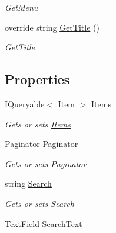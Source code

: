 \begin{DoxyCompactItemize}
\begin{DoxyCompactList}\small\item\em Get\+Menu \end{DoxyCompactList}\item 
override string \mbox{\hyperlink{class_gtd_app_1_1_console_1_1_views_1_1_items_1_1_list_items_view_a0c378daa3b8350805980a2def53772a0}{Get\+Title}} ()
\begin{DoxyCompactList}\small\item\em Get\+Title \end{DoxyCompactList}\end{DoxyCompactItemize}
\subsection*{Properties}
\begin{DoxyCompactItemize}
\item 
I\+Queryable$<$ \mbox{\hyperlink{class_gtd_app_1_1_data_1_1_item}{Item}} $>$ \mbox{\hyperlink{class_gtd_app_1_1_console_1_1_views_1_1_items_1_1_list_items_view_a44ac0bdbb20231801a691f2bc08a797b}{Items}}
\begin{DoxyCompactList}\small\item\em Gets or sets \mbox{\hyperlink{namespace_gtd_app_1_1_console_1_1_views_1_1_items}{Items}} \end{DoxyCompactList}\item 
\mbox{\hyperlink{class_gtd_app_1_1_repository_1_1_paginator}{Paginator}} \mbox{\hyperlink{class_gtd_app_1_1_console_1_1_views_1_1_items_1_1_list_items_view_a110b2521ba630be5f47f9779077d25fa}{Paginator}}
\begin{DoxyCompactList}\small\item\em Gets or sets Paginator \end{DoxyCompactList}\item 
string \mbox{\hyperlink{class_gtd_app_1_1_console_1_1_views_1_1_items_1_1_list_items_view_ac86fb022fb2621ab97babc3bafcf0c7f}{Search}}
\begin{DoxyCompactList}\small\item\em Gets or sets Search \end{DoxyCompactList}\item 
Text\+Field \mbox{\hyperlink{class_gtd_app_1_1_console_1_1_views_1_1_items_1_1_list_items_view_adcc6538bc74951dfd1d6566ee2160704}{Search\+Text}}

\end{DoxyCompactItemize}
